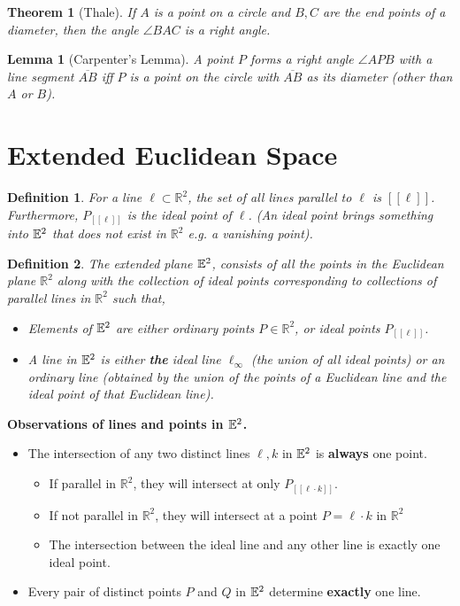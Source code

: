 \documentclass[12pt]{amsart}
\newtheorem*{theorem}{Theorem}
\newtheorem*{lemma}{Lemma}
\newtheorem*{definition}{Definition}
\theoremstyle{remark}
\newtheorem*{basic notion}{Basic Notion}
\newcommand{\RR}{\ensuremath{\mathbb R}}
\newcommand{\EE}{{\ensuremath\mathbb E}}
\newcommand{\ol}[1]{\overline{#1}}
\begin{document}
\begin{theorem}[Thale] If $A$ is a point on a circle and $B,C$ are the end points of a diameter, then the angle $\angle BAC$ is  a right angle.
\end{theorem}
\smallskip

\begin{lemma}[Carpenter's Lemma] A point $P$ forms a right angle $\angle APB$ with a line segment $\ol{AB}$ iff $P$ is a point on the circle with $\ol{AB}$ as its diameter (other than $A$ or $B$).\end{lemma}
\smallskip

\section{Extended Euclidean Space}

\begin{definition} 
For a line $\ell \subset \RR^2$, the set of all lines parallel to $\ell$ is $[\! [\ell]\!]$. Furthermore,  $P_{[\![\ell]\!]}$ is the ideal point of $\ell$. (An ideal point brings something into $\EE^2$ that does not exist in $\RR^2$ e.g. a vanishing point).
\end{definition}
\smallskip

\begin{definition}
The extended plane $\EE^2$, consists of all the points in the Euclidean plane $\RR^2$ along with the collection of ideal points corresponding to collections of parallel lines in $\RR^2$ such that,
\begin{itemize}
\item Elements of $\EE^2$ are either ordinary points $P\in \RR^2$, or ideal points $P_{[\![\ell]\!]}$.
\item A line in $\EE^2$ is either \textbf{the} ideal line $\ell_{\infty}$ (the union of all ideal points) or an ordinary line (obtained by the union of the points of a Euclidean line and the ideal point of that Euclidean line).
\end{itemize}
\end{definition}
\smallskip

\noindent\textbf{Observations of lines and points in $\EE^2$.}

\begin{itemize}
\item The intersection of any two distinct lines $\ell,k$ in $\EE^2$ is \textbf{always} one point. 
\begin{itemize}
\item If parallel in $\RR^2$, they will intersect at only $P_{[\![\ell\cdot k]\!]}$.
\item If not parallel in $\RR^2$, they will intersect at a point $P=\ell\cdot k$ in $\RR^2$
\item The intersection between the ideal line and any other line is exactly one ideal point.
\end{itemize}
 \item Every pair of distinct points $P$ and $Q$ in $\EE^2$ determine \textbf{exactly} one line.
 \end{itemize}
\smallskip
\end{document}
